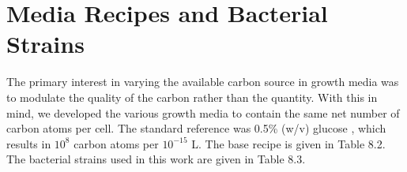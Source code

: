 \documentclass[12pt]{caltech_thesis}
\begin{document}
\hypertarget{media-recipes-and-bacterial-strains}{%
\section{Media Recipes and Bacterial
Strains}\label{media-recipes-and-bacterial-strains}}

The primary interest in varying the available carbon source in growth
media was to modulate the quality of the carbon rather than the
quantity. With this in mind, we developed the various growth media to
contain the same net number of carbon atoms per cell. The standard
reference was 0.5\% (w/v) glucose \autocite{garcia2011}, which results
in \(10^8\) carbon atoms per \(10^{-15}\) L. The base recipe is given in
Table 8.2. The bacterial strains used in this work are given in Table
8.3.
\end{document}
